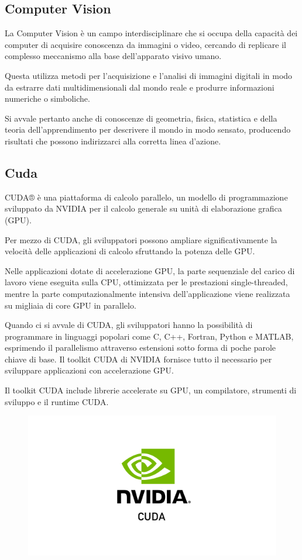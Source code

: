 \subsection{Computer Vision}
La Computer Vision è un campo interdisciplinare che si occupa della capacità dei computer di acquisire conoscenza da immagini o video, cercando di replicare il complesso meccanismo alla base dell'apparato visivo umano. 

Questa utilizza metodi per l'acquisizione e l'analisi di immagini digitali in modo da estrarre dati multidimensionali dal mondo reale e produrre informazioni numeriche o simboliche. 

Si avvale pertanto anche di conoscenze di geometria, fisica, statistica e della teoria dell'apprendimento per descrivere il mondo in modo sensato, producendo risultati che possono indirizzarci alla corretta linea d'azione.

\subsection{Cuda} 
CUDA® \cite{CUDA} è una piattaforma di calcolo parallelo, un modello di programmazione sviluppato da NVIDIA per il calcolo generale su unità di elaborazione grafica (GPU). 

Per mezzo di CUDA, gli sviluppatori possono ampliare significativamente la velocità delle applicazioni di calcolo sfruttando la potenza delle GPU.

Nelle applicazioni dotate di accelerazione GPU, la parte sequenziale del carico di lavoro viene eseguita sulla CPU, ottimizzata per le prestazioni single-threaded, mentre la parte computazionalmente intensiva dell’applicazione viene realizzata su migliaia di core GPU in parallelo. 

Quando ci si avvale di CUDA, gli sviluppatori hanno la possibilità di programmare in linguaggi popolari come C, C++, Fortran, Python e MATLAB, esprimendo il parallelismo attraverso estensioni sotto forma di poche parole chiave di base.
Il toolkit CUDA di NVIDIA fornisce tutto il necessario per sviluppare applicazioni con accelerazione GPU.

Il toolkit CUDA include librerie accelerate su GPU, un compilatore, strumenti di sviluppo e il runtime CUDA.

\begin{figure}
    \begin{center}    
        \includegraphics[width=0.9\linewidth]{images/image1.png}
    \end{center}
\end{figure}

